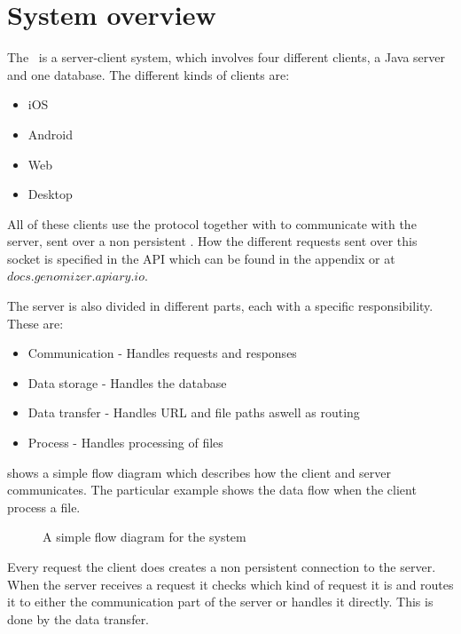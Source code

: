 \label{chap:com_latexoverview}
\section{System overview}

The \appName\ is a server-client system, which involves four different
clients, a Java server and one  database. The
different kinds of clients are:

\begin{itemize}
\item iOS
\item Android
\item Web
\item Desktop
\end{itemize}

All of these clients use the  protocol together with
 to communicate with the server, sent over a non persistent
. How the different requests sent over this socket
is specified in the API which can be found in the appendix or at
$docs.genomizer.apiary.io$.

The server is also divided in different parts, each with a specific
responsibility. These are:

\begin{itemize}
\item Communication - Handles requests and responses
\item Data storage - Handles the database
\item Data transfer - Handles URL and file paths aswell as routing
\item Process - Handles processing of files
\end{itemize}

 shows a simple flow diagram which
describes how the client and server communicates. The particular
example shows the data flow when the client process a file.

\begin{figure}[htb]
\caption{A simple flow diagram for the system}
\label{fig:com_systemoverview}
\end{figure}

Every request the client does creates a non persistent connection to
the server. When the server receives a request it checks which kind of
request it is and routes it to either the communication part of the
server or handles it directly. This is done by the data transfer.

